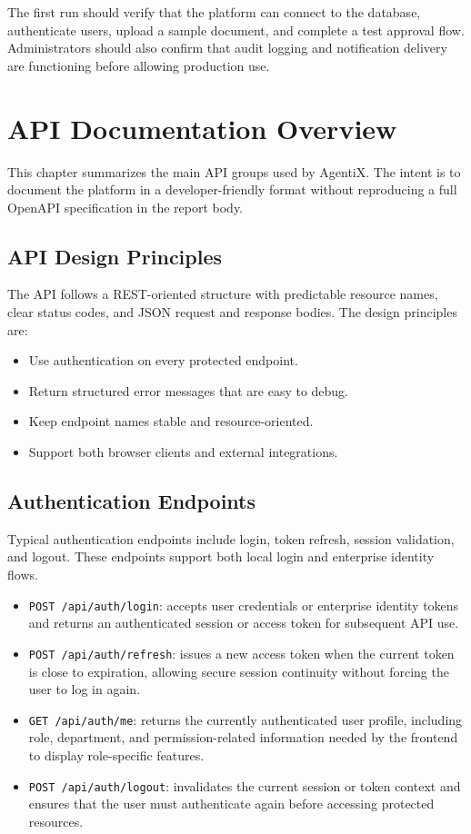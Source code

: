 \documentclass[12pt,oneside,openright,a4paper]{cpe-english-project}
\begin{document}
The first run should verify that the platform can connect to the database, authenticate users, upload a sample document, and complete a test approval flow. Administrators should also confirm that audit logging and notification delivery are functioning before allowing production use.

\newpage

\chapter{API Documentation Overview}

This chapter summarizes the main API groups used by AgentiX. The intent is to document the platform in a developer-friendly format without reproducing a full OpenAPI specification in the report body.

\section{API Design Principles}

The API follows a REST-oriented structure with predictable resource names, clear status codes, and JSON request and response bodies. The design principles are:

\begin{itemize}
  \item Use authentication on every protected endpoint.
  \item Return structured error messages that are easy to debug.
  \item Keep endpoint names stable and resource-oriented.
  \item Support both browser clients and external integrations.
\end{itemize}

\section{Authentication Endpoints}

Typical authentication endpoints include login, token refresh, session validation, and logout. These endpoints support both local login and enterprise identity flows.

\begin{itemize}
  \item \texttt{POST /api/auth/login}: accepts user credentials or enterprise identity tokens and returns an authenticated session or access token for subsequent API use.
  \item \texttt{POST /api/auth/refresh}: issues a new access token when the current token is close to expiration, allowing secure session continuity without forcing the user to log in again.
  \item \texttt{GET /api/auth/me}: returns the currently authenticated user profile, including role, department, and permission-related information needed by the frontend to display role-specific features.
  \item \texttt{POST /api/auth/logout}: invalidates the current session or token context and ensures that the user must authenticate again before accessing protected resources.
\end{itemize}
\end{document}
